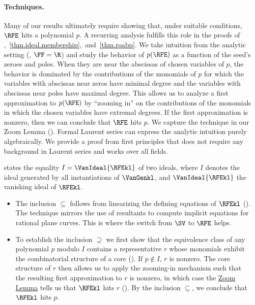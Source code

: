 \paragraph{Techniques.}
Many of our results ultimately require showing that,
under suitable conditions,
\(\RFE\) hits a polynomial \(p\).
A recurring analysis fulfills this role in the proofs of
,~\ref{thm.ideal.membership},~and~\ref{thm.roabp}.
We take intuition from the analytic setting (\eg, \(\FF = \R\))
and study the behavior of \(p(\RFE)\) as a function of the seed's zeroes and poles. When they are near the abscissas of chosen variables of
\(p\), the behavior is dominated by the contributions of the monomials of \(p\)
for which
the variables with abscissas near zeros have minimal degree and
the variables with abscissas near poles have maximal degree.
This allows us to analyze a first approximation to \(p(\RFE)\) by ``zooming in'' on
the contributions of the monomials in which the chosen
variables have extremal degrees.
If the first approximation is nonzero,
then we can conclude that \(\RFE\) hits \(p\).
We capture the technique in our Zoom Lemma ().
Formal Laurent series can express the analytic intuition purely algebraically. We provide a proof from first principles that does not require any background in Laurent series and works over all fields.

 states the equality $I = \VanIdeal{\RFEkl}$ of two ideals,
where $I$ denotes the ideal generated by all instantiations of $\VanGenkl$,
and $\VanIdeal{\RFEkl}$ the vanishing ideal of $\RFEkl$.
\begin{itemize}
  \item
    The inclusion $\subseteq$ follows from linearizing the defining equations
    of $\RFEkl$ ().
    The technique mirrors the use of resultants to compute implicit equations
    for rational plane curves.
    This is where the switch from $\SV$ to $\RFE$ helps. 
  \item
    To establish the inclusion $\supseteq$ we first show that the
    equivalence class of any polynomial $p$ modulo $I$
    contains a representative $r$ whose monomials exhibit the combinatorial
    structure of a core (). If $p \not\in I$, $r$ is nonzero.
    The core structure of $r$ then allows us to apply the zooming-in mechanism such that the resulting first approximation to $r$ is nonzero, in which case the \hyperref[lem.multi-zsub-deriv]{Zoom Lemma} tells us that $\RFEkl$ hits $r$ (). By the inclusion $\subseteq$, we conclude that $\RFEkl$ hits $p$.
\end{itemize}


